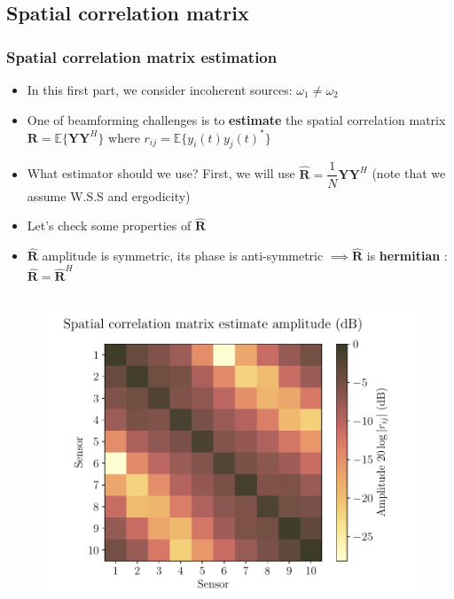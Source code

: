 \documentclass[UKenglish,8pt,aspectratio=1610]{beamer}
\begin{document}
	\subsection{Spatial correlation matrix}
	\begin{frame}
		\frametitle{Spatial correlation matrix estimation  \cite{twoDecades,uncini,Johnson1993ArraySP}}
		\begin{itemize}
			\item In this first part, we consider incoherent sources: $\omega_1\neq\omega_2$ 
			\item One of beamforming challenges is to \textbf{estimate} the spatial correlation matrix $\mathbf{R}=\mathbb{E}\lbrace \mathbf{Y}\mathbf{Y}^H\rbrace$ where $r_{ij}=\mathbb{E}\lbrace y_i(t)y_j(t)^\ast\rbrace$
			\item What estimator should we use? First, we will use $\boldsymbol{\hat{\mathbf{R}}}=\dfrac{1}{N}\mathbf{Y}\mathbf{Y}^H$ (note that we assume W.S.S and ergodicity)
			\item Let's check some properties of $\boldsymbol{\hat{\mathbf{R}}}$
			\item $\boldsymbol{\hat{\mathbf{R}}}$ amplitude is symmetric, its phase is anti-symmetric $\implies\boldsymbol{\hat{\mathbf{R}}}$ is \textbf{hermitian} : $\boldsymbol{\hat{\mathbf{R}}}=\boldsymbol{\hat{\mathbf{R}}}^H$ 
		\end{itemize}
	\vspace{-15pt}
	\begin{columns}
		\begin{column}{0.5\textwidth}
			\begin{figure}[h!]
				\centering
				\includegraphics[scale=0.37]{question1/part_A_question_1_autocorrelation_matrix_amplitude.pdf}

\end{figure}
\end{column}
\end{columns}
\end{frame}
\end{document}
